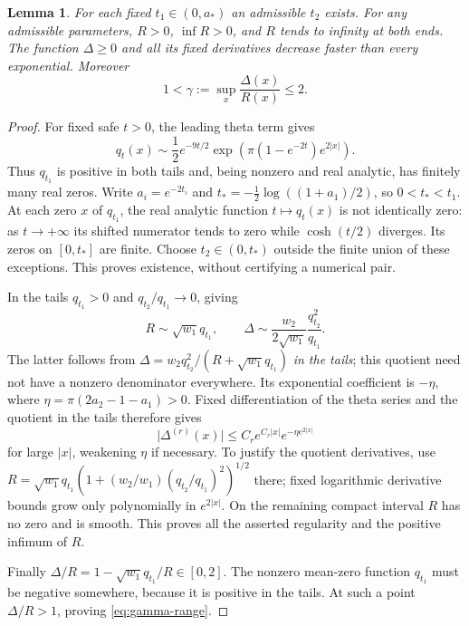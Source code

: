\documentclass[11pt,a4paper]{article}
\newcommand{\abs}[1]{\lvert #1\rvert}
\newtheorem{lemma}[theorem]{Lemma}
\theoremstyle{definition}
\theoremstyle{remark}
\numberwithin{equation}{section}
\begin{document}
\begin{lemma}\label{lem:envelope-exists}
For each fixed $t_1\in(0,a_*)$ an admissible $t_2$ exists. For any
admissible parameters, $R>0$, $\inf R>0$, and $R$ tends to infinity
at both ends. The function $\Delta\ge0$ and all its fixed derivatives
decrease faster than every exponential. Moreover
\begin{equation}\label{eq:gamma-range}
 1<\gamma:=\sup_x\frac{\Delta(x)}{R(x)}\le2.
\end{equation}
\end{lemma}
\begin{proof}
For fixed safe $t>0$, the leading theta term gives
\begin{equation}\label{eq:q-asymptotic}
 q_t(x)\sim\frac12e^{-9t/2}
       \exp\left(\pi(1-e^{-2t})e^{2\abs x}\right).
\end{equation}
Thus $q_{t_1}$ is positive in both tails and, being nonzero and real
analytic, has finitely many real zeros. Write $a_i=e^{-2t_i}$ and
$t_*=-\tfrac12\log((1+a_1)/2)$, so $0<t_*<t_1$.
At each zero $x$ of $q_{t_1}$, the real analytic function $t\mapsto q_t(x)$
is not identically zero: as $t\to+\infty$ its shifted numerator tends to
zero while $\cosh(t/2)$ diverges. Its zeros on $[0,t_*]$ are finite.
Choose $t_2\in(0,t_*)$ outside the finite union of these exceptions.
This proves existence, without certifying a numerical pair.

In the tails $q_{t_1}>0$ and $q_{t_2}/q_{t_1}\to0$, giving
\begin{equation}\label{eq:Delta-asymptotic}
 R\sim\sqrt{w_1}q_{t_1},\qquad
 \Delta\sim\frac{w_2}{2\sqrt{w_1}}\frac{q_{t_2}^2}{q_{t_1}}.
\end{equation}
The latter follows from
$\Delta=w_2q_{t_2}^2/(R+\sqrt{w_1}q_{t_1})$ \emph{in the tails};
this quotient need not have a nonzero denominator everywhere.
Its exponential coefficient is $-\eta$, where
$\eta=\pi(2a_2-1-a_1)>0$.
Fixed differentiation of the theta series and the quotient in the tails
therefore gives
\begin{equation}\label{eq:Delta-decay}
 \abs{\Delta^{(r)}(x)}\le C_r e^{C_r\abs x}e^{-\eta e^{2\abs x}}
\end{equation}
for large $\abs x$, weakening $\eta$ if necessary. To justify the
quotient derivatives, use
$R=\sqrt{w_1}q_{t_1}(1+(w_2/w_1)(q_{t_2}/q_{t_1})^2)^{1/2}$ there;
fixed logarithmic derivative bounds grow only polynomially in $e^{2\abs x}$.
On the remaining compact interval $R$ has no zero and is smooth.
This proves all the asserted regularity and the positive infimum of $R$.

Finally $\Delta/R=1-\sqrt{w_1}q_{t_1}/R\in[0,2]$. The nonzero
mean-zero function $q_{t_1}$ must be negative somewhere, because it is
positive in the tails. At such a point $\Delta/R>1$, proving
\eqref{eq:gamma-range}.
\end{proof}
\end{document}
